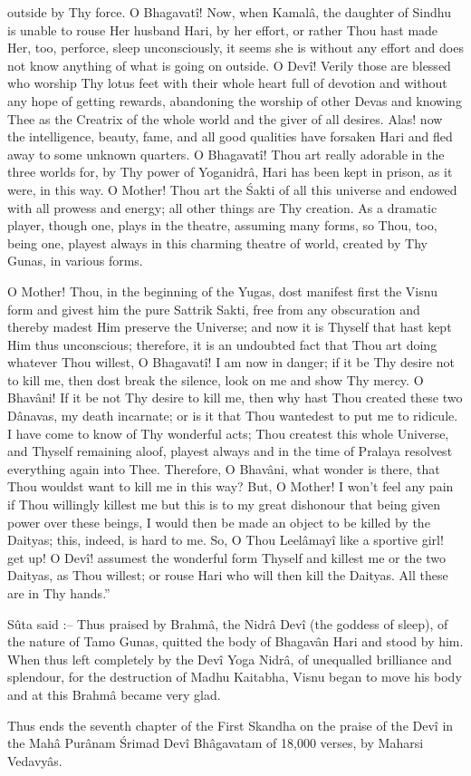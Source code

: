 outside by Thy force. O Bhagavat\^i! Now, when Kamal\^a, the daughter of Sindhu is unable to rouse Her husband Hari, by her effort, or rather Thou hast made Her, too, perforce, sleep unconsciously, it seems she is without any effort and does not know anything of what is going on outside. O Dev\^i! Verily those are blessed who worship Thy lotus feet with their whole heart full of devotion and without any hope of getting rewards, abandoning the worship of other Devas and knowing Thee as the Creatrix of the whole world and the giver of all desires. Alas! now the intelligence, beauty, fame, and all good qualities have forsaken Hari and fled away to some unknown quarters. O Bhagavat\^i! Thou art really adorable in the three worlds for, by Thy power of Yoganidr\^a, Hari has been kept in prison, as it were, in this way. O Mother! Thou art the \'Sakti of all this universe and endowed with all prowess and energy; all other things are Thy creation. As a dramatic player, though one, plays in the theatre, assuming many forms, so Thou, too, being one, playest always in this charming theatre of world, created by Thy Gunas, in various forms.

O Mother! Thou, in the beginning of the Yugas, dost manifest first the Visnu form and givest him the pure Sattrik Sakti, free from any obscuration and thereby madest Him preserve the Universe; and now it is Thyself that hast kept Him thus unconscious; therefore, it is an undoubted fact that Thou art doing whatever Thou willest, O Bhagavat\^i! I am now in danger; if it be Thy desire not to kill me, then dost break the silence, look on me and show Thy mercy. O Bhav\^ani! If it be not Thy desire to kill me, then why hast Thou created these two D\^anavas, my death incarnate; or is it that Thou wantedest to put me to ridicule. I have come to know of Thy wonderful acts; Thou createst this whole Universe, and Thyself remaining aloof, playest always and in the time of Pralaya resolvest everything again into Thee. Therefore, O Bhav\^ani, what wonder is there, that Thou wouldst want to kill me in this way? But, O Mother! I won't feel any pain if Thou willingly killest me but this is to my great dishonour that being given power over these beings, I would then be made an object to be killed by the Daityas; this, indeed, is hard to me. So, O Thou Leel\^amay\^i like a sportive girl! get up! O Dev\^i! assumest the wonderful form Thyself and killest me or the two Daityas, as Thou willest; or rouse Hari who will then kill the Daityas. All these are in Thy hands.''

S\^uta said :-- Thus praised by Brahm\^a, the Nidr\^a Dev\^i (the goddess of sleep), of the nature of Tamo Gunas, quitted the body of Bhagav\^an Hari and stood by him. When thus left completely by the Dev\^i Yoga Nidr\^a, of unequalled brilliance and splendour, for the destruction of Madhu Kaitabha, Visnu began to move his body and at this Brahm\^a became very glad.

Thus ends the seventh chapter of the First Skandha on the praise of the Dev\^i in the Mah\^a Pur\^anam \'Srimad Dev\^i Bh\^agavatam of 18,000 verses, by Maharsi Vedavy\^as.